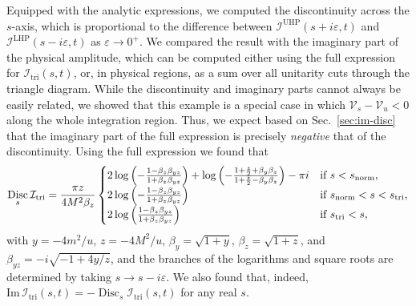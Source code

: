 \documentclass[12pt]{article}
\numberwithin{figure}{section}
\DeclareMathOperator{\Disc}{Disc}
\def \eps {\varepsilon}
\def \V {\mathcal{V}}
\def \I {\mathcal{I}}
\def \Im {\mathrm{Im}}
\def \triangle {\mathrm{tri}}
\def \normal {\mathrm{norm}}
\def \UHP {\mathrm{UHP}}
\def \LHP {\mathrm{LHP}}
\begin{document}
    Equipped with the analytic expressions, we computed the discontinuity across the $s$-axis, which is proportional to the difference between $\I^{\UHP}(s+i\eps, t)$ and $\I^{\LHP}(s-i\eps,t)$ as $\eps \to 0^+$. We compared the result with the imaginary part of the physical amplitude, which can be computed either using the full expression for $\I_\triangle(s,t)$, or, in physical regions, as a sum over all unitarity cuts through the triangle diagram. While the discontinuity and imaginary parts cannot always be easily related, we showed that this example is a special case in which $\V_s-\V_u<0$ along the whole integration region. Thus, we expect based on Sec.~\ref{sec:im-disc} that the imaginary part of the full expression is precisely \textit{negative} that of the discontinuity. Using the full expression we found that 
    \begin{equation}
         \Disc_s \mathcal{I}_\triangle = 
         \frac{\pi z}{4 M^2 \beta_z} 
         \begin{cases}
             2 \log \left( - \frac{1-\beta_z \beta_{yz}}{1+\beta_z \beta_{yz}}\right) + \log \left(- \frac{1+\frac{z}{2}+\beta_y \beta_z}{1+\frac{z}{2} -\beta_y \beta_z} \right) - \pi i  \hfill &\text{if }  s < s_{\normal},
             \\
             2 \log \left( - \frac{1-\beta_z \beta_{yz}}{1+\beta_z \beta_{yz}}\right) \hfill &\text{if }s_{\normal} < s < s_{\triangle},
             \\
             2 \log \left( \frac{1-\beta_z \beta_{yz}}{1+\beta_z \beta_{yz}}\right) \hfill &\text{if } s_{\triangle} < s,
         \end{cases}
         \label{eq:Disc_cases_summary}
    \end{equation}
    with $y = - 4 m^2/u$, $z = - 4 M^2/u$, $\beta_y = \sqrt{1+y}$, $\beta_z = \sqrt{1+z}$, and $\beta_{yz}  = - i \sqrt{-1+4y/z}$, and the branches of the logarithms and square roots are determined by taking $s\to s- i\varepsilon$. We also found that, indeed, $\Im \, \I_\triangle (s,t) = - \Disc_s \I_\triangle(s,t)$ for any real $s$.
    
\end{document}
